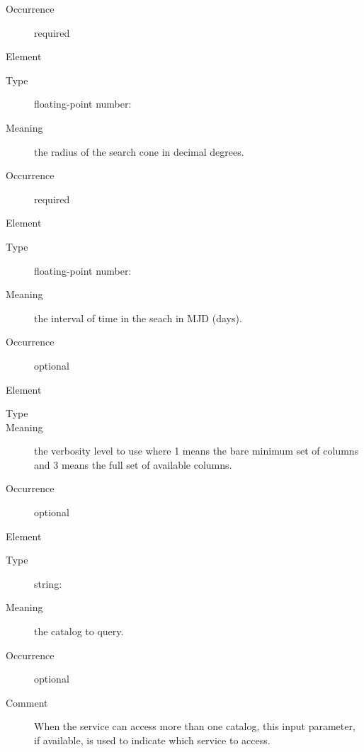 \documentclass[11pt,a4paper]{ivoa}
\newcommand\ada[1]{\textcolor{blue}{\textbf{#1}}}
\begin{document}
\begin{generated}
\begin{bigdescription}
\begin{description}
\item[Occurrence] required

\end{description}
\item[Element \xmlel{sr}]
\begin{description}
\item[Type] floating-point number: 
\item[Meaning] 
                   the radius of the search cone in decimal degrees.
               
\item[Occurrence] required

\end{description}

\item[Element \xmlel{time}]
\begin{description}
\item[Type] floating-point number: 
\item[Meaning] 
                    the interval of time in the seach in MJD (days). 
               
\todo{\ada{Added this here}}
                  \item[Occurrence] optional

\end{description}


\item[Element \xmlel{verb}]
\begin{description}
\item[Type] 
\item[Meaning] 
                   the verbosity level to use where 1 means the bare
                   minimum set of columns and 3 means the full set of 
                   available columns.
               
\item[Occurrence] optional 

\end{description}
\item[Element \xmlel{catalog}]
\begin{description}
\item[Type] string: 
\item[Meaning] 
                   the catalog to query.  
               
\item[Occurrence] optional
\item[Comment] 
                   When the service can access more than one catalog,
                   this input parameter, if available, is used to
                   indicate which service to access.
               


\end{description}
\end{bigdescription}
\end{generated}
\end{document}
